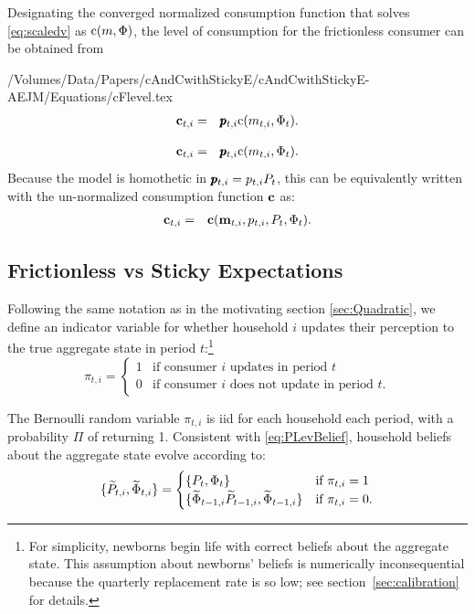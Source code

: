 \documentclass[titlepage]{./econtex}
\begin{document}
Designating the converged normalized consumption function that solves \eqref{eq:scaledv} as
$\mathrm{c}(m,\Phi)$, the level of consumption for the frictionless consumer can be obtained from
\begin{verbatimwrite}{/Volumes/Data/Papers/cAndCwithStickyE/cAndCwithStickyE-AEJM/Equations/cFlevel.tex}
\begin{eqnarray}
  \label{eq:cFlevel}
   \mathbf{c}_{t,i} & = & \pmb{p}_{t,i} \mathrm{c}(m_{t,i},\Phi_t)  \nonumber
.
\end{eqnarray}
\end{verbatimwrite}
\begin{eqnarray}
  \label{eq:cFlevel}
   \mathbf{c}_{t,i} & = & \pmb{p}_{t,i} \mathrm{c}(m_{t,i},\Phi_t)  \nonumber
.
\end{eqnarray}
 Because the model is homothetic in $\pmb{p}_{t,i}={p}_{t,i} {P}_{t}$, this can be equivalently written with the un-normalized consumption function $\textbf{c}$ as:
\begin{eqnarray*}
\mathbf{c}_{t,i} & = & \textbf{c}(\mathbf{m}_{t,i}, p_{t,i}, {P}_t, {\Phi}_t).
\end{eqnarray*}


\subsection{Frictionless vs Sticky Expectations}\label{sec:StickySOE}

Following the same notation as in the motivating section \ref{sec:Quadratic}, we define an indicator variable for whether household $i$ updates their perception to the true aggregate state in period $t$:\footnote{For simplicity, newborns begin life with correct beliefs about the aggregate state.  This assumption about newborns' beliefs is numerically inconsequential because the quarterly replacement rate is so low; see section~\ref{sec:calibration} for details.}
\begin{equation*}
\pi_{t,i} =
\begin{cases}
   1 & \text{if consumer $i$ updates in period $t$}
\\ 0 & \text{if consumer $i$ does not update in period $t$}.
\end{cases}
\end{equation*}

The Bernoulli random variable $\pi_{t,i}$ is iid for each household each period, with a probability $\Pi$ of returning 1.  Consistent with \eqref{eq:PLevBelief}, household beliefs about the aggregate state evolve according to:
\begin{equation}\label{eq:PLevBeliefSOE}
\{\widetilde{P}_{t,i},\widetilde{\Phi}_{t,i}\} = \begin{cases}
\{P_t, \Phi_t\} & \text{if } \pi_{t,i} = 1 \\
\{\widetilde{\Phi}_{t-1,i} \widetilde{P}_{t-1,i} , \widetilde{\Phi}_{t-1,i} \} & \text{if } \pi_{t,i} = 0.
\end{cases}
\end{equation}
\end{document}
